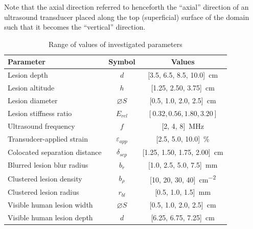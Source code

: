 		Note that the axial direction referred to henceforth  the ``axial'' direction of an ultrasound transducer placed along the top (superficial) surface of the domain such that it becomes the ``vertical'' direction.

		\begin{table}[!t]
			\centering
			\caption{Range of values of investigated parameters}
			\label{tab:parametervalues}
			\begin{tabular}{lcc}
				\toprule
				Parameter & Symbol & Values \\
				\midrule
				Lesion depth & $d$ & \SI{[3.5, 6.5, 8.5, 10.0]}{cm} \\
				Lesion altitude & $h$ & \SI{[1.25, 2.50, 3.75]}{cm} \\
				Lesion diameter & $\diameter S$ & \SI{[0.5, 1.0, 2.0, 2.5]}{cm} \\
				Lesion stiffness ratio & $E_{rel}$ & $[0.32, 0.56, 1.80, 3.20]$ \\
				Ultrasound frequency & $f$ & \SI{[2, 4, 8]}{MHz} \\
				Transudcer-applied strain & $\varepsilon_{app}$ & \SI{[2.5, 5.0, 10.0]}{\percent} \\
				Colocated separation distance & $\delta_{sep}$ & \SI{[1.25, 1.50, 1.75, 2.00]}{cm} \\
				Blurred lesion blur radius & $b_r$ & \SI{[1.0, 2.5, 5.0, 7.5]}{mm} \\
				Clustered lesion density & $b_\rho$ & \SI{[10, 20, 30, 40]}{cm^{-2}} \\
				Clustered lesion radius & $r_{bl}$ & \SI{[0.5, 1.0, 1.5]}{mm} \\
				Visible human lesion width & $\diameter S$ & \SI{[0.5, 1.0, 2.0, 2.5]}{cm} \\
				Visible human lesion depth & $d$ & \SI{[6.25, 6.75, 7.25]}{cm} \\
				\bottomrule
			\end{tabular}
		\end{table}

